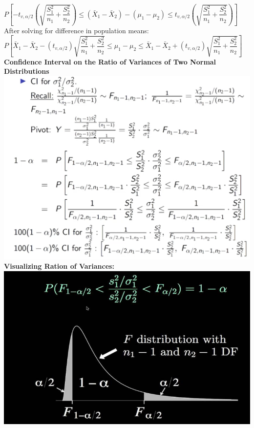\documentclass[]{article}
\begin{document}
$P \left[  -t_{v, \alpha / 2} \left( \sqrt{\dfrac{S^2_1}{n_1} + \dfrac{S^2_2}{n_2}} \right) \le  (  \bar{X}_1 - \bar{X}_2 )  -  (\mu_1 - \mu_2) \le t_{v, \alpha /2} \left( \sqrt{\dfrac{S^2_1}{n_1} + \dfrac{S^2_2}{n_2}} \right)  \right]$
\newline
\newline
\newline After solving for difference in population means:
\newline
\newline$P \left[ \bar{X}_1 - \bar{X}_2 - ( t_{v, \alpha / 2} )  \sqrt{\dfrac{S^2_1}{n_1} + \dfrac{S^2_2}{n_2}}  \le  \mu_1 - \mu_2 \le \bar{X}_1 - \bar{X}_2  + ( t_{v, \alpha /2} ) \sqrt{\dfrac{S^2_1}{n_1} + \dfrac{S^2_2}{n_2}}  \right]$
\newline 
\newline
\newline 
\newline\Large\textbf{Confidence Interval on the Ratio of Variances of Two Normal Distributions}
\newline
\newline
\includegraphics[scale=0.8]{ratio_of_variances}
\newline
\newline \textbf{Visualizing Ration of Variances:}
\newline
\newline
\includegraphics[scale=0.99]{visualizing_ratio_variances}
\end{document}
